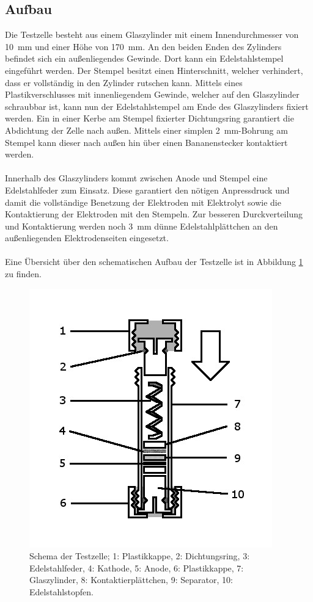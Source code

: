 \documentclass[a4paper, 11pt, headsepline,footsepline,twoside,abstract]{scrbook}
\begin{document}
\subsection{Aufbau}
Die Testzelle besteht aus einem Glaszylinder mit einem Innendurchmesser von \SI{10}{\milli\meter} und einer Höhe von \SI{170}{\milli\meter}. An den beiden Enden des Zylinders befindet sich ein außenliegendes Gewinde. Dort kann ein Edelstahlstempel eingeführt werden. Der Stempel besitzt einen Hinterschnitt, welcher verhindert, dass er vollständig in den Zylinder rutschen kann. Mittels eines Plastikverschlusses mit innenliegendem Gewinde, welcher auf den Glaszylinder schraubbar ist, kann nun der Edelstahlstempel am Ende des Glaszylinders fixiert werden. Ein in einer Kerbe am Stempel fixierter Dichtungsring garantiert die Abdichtung der Zelle nach außen. Mittels einer simplen \SI{2}{\milli\meter}-Bohrung am Stempel kann dieser nach außen hin über einen Bananenstecker kontaktiert werden.\\\\
Innerhalb des Glaszylinders kommt zwischen Anode und Stempel eine Edelstahlfeder zum Einsatz. Diese garantiert den nötigen Anpressdruck und damit die vollständige Benetzung der Elektroden mit Elektrolyt sowie die Kontaktierung der Elektroden mit den Stempeln. Zur besseren Durckverteilung und Kontaktierung werden noch \SI{3}{\milli\meter} dünne Edelstahlplättchen an den außenliegenden Elektrodenseiten eingesetzt.\\\\
Eine Übersicht über den schematischen Aufbau der Testzelle ist in Abbildung \ref{schema_zelle} zu finden.
\begin{figure}[h]
	\centering
	\includegraphics[width=0.7\columnwidth]{images/Schema_Zelle.jpg}
	\caption{Schema der Testzelle; 
			1: Plastikkappe,
			2: Dichtungsring,
			3: Edelstahlfeder,
			4: Kathode,
			5: Anode,
			6: Plastikkappe,
			7: Glaszylinder,
			8: Kontaktierplättchen,
			9: Separator,
			10: Edelstahlstopfen.
			}
	\label{schema_zelle}
\end{figure}
\end{document}
